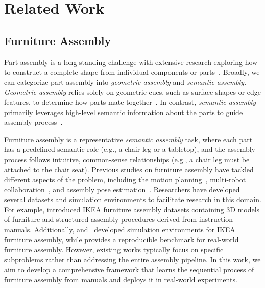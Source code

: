 \section{Related Work}
\subsection{Furniture Assembly}
Part assembly is a long-standing challenge with extensive research exploring how to construct a complete shape from individual components or parts~\citep{chen2022neural,funkhouser2011learning,jones2021automate,lee2021ikea,li2020learning,scarpellini2024diffassemble,wu2023leveraging,tian2024asap,tian2022assemble}. Broadly, we can categorize part assembly into \emph{geometric assembly} and \emph{semantic assembly}. \emph{Geometric assembly} relies solely on geometric cues, such as surface shapes or edge features, to determine how parts mate together~\citep{chen2022neural,wu2023leveraging,sellan2022breaking,du2024generative}. In contrast, \emph{semantic assembly} primarily leverages high-level semantic information about the parts to guide assembly process~\citep{funkhouser2011learning,jones2021automate,lee2021ikea,li2020learning,tian2022assemble}.

Furniture assembly is a representative \emph{semantic assembly} task, where each part has a predefined semantic role (e.g., a chair leg or a tabletop), and the assembly process follows intuitive, common-sense relationships (e.g., a chair leg must be attached to the chair seat). Previous studies on furniture assembly have tackled different aspects of the problem, including the motion planning~\citep{suarez2018can}, multi-robot collaboration~\citep{knepper2013ikeabot}, and assembly pose estimation~\citep{li2020learning,yu2021roboassembly,li2024category}. Researchers have developed several datasets and simulation environments to facilitate research in this domain. For example,
\citet{wang2022ikea,liu2024ikea} introduced IKEA furniture assembly datasets containing 3D models of furniture and structured assembly procedures derived from instruction manuals. Additionally, \citet{lee2021ikea} and~\citet{yu2021roboassembly} developed simulation environments for IKEA furniture assembly, while
\citet{heo2023furniturebench} provides a reproducible benchmark for real-world furniture assembly.
However, existing works typically focus on specific subproblems rather than addressing the entire assembly pipeline. 
In this work, we aim to develop a comprehensive framework that learns the sequential process of furniture assembly from manuals and deploys it in real-world experiments.

